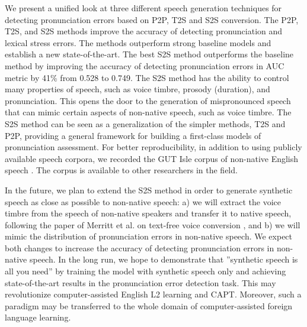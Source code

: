 \documentclass[]{interact}
\theoremstyle{plain}%
\theoremstyle{definition}
\theoremstyle{remark}
\begin{document}
We present a unified look at three different speech generation techniques for detecting pronunciation errors based on P2P, T2S and S2S conversion. The P2P, T2S, and S2S methods improve the accuracy of detecting pronunciation and lexical stress errors. The methods outperform strong baseline models and establish a new state-of-the-art. 
The best S2S method outperforms the baseline method \cite{leung2019cnn} by improving the accuracy of detecting pronunciation errors in AUC metric by 41\% from 0.528 to 0.749.  The S2S method has the ability to control many properties of speech, such as voice timbre, prosody (duration), and pronunciation. This opens the door to the generation of mispronounced speech that can mimic certain aspects of non-native speech, such as voice timbre. The S2S method can be seen as a generalization of the simpler methods, T2S and P2P, providing a general framework for building a first-class models of pronunciation assessment. For better reproducibility, in addition to using publicly available speech corpora, we recorded the GUT Isle corpus of non-native English speech  \cite{Weber2020}. The corpus is available to other researchers in the field.

In the future, we plan to extend the S2S method in order to generate synthetic speech as close as possible to non-native speech: a) we will extract the voice timbre from the speech of non-native speakers and transfer it to native speech, following the paper of Merritt et al. on text-free voice conversion \cite{merritt22_icassp_vc}, and b) we will mimic the distribution of pronunciation errors in non-native speech. We expect both changes to increase the accuracy of detecting pronunciation errors in non-native speech. In the long run, we hope to demonstrate that ''synthetic speech is all you need'' by training the model with synthetic speech only and achieving  state-of-the-art results in the pronunciation error detection task. This may revolutionize computer-assisted English L2 learning and CAPT. Moreover, such a paradigm may be transferred to the whole domain of computer-assisted foreign language learning.



\end{document}
